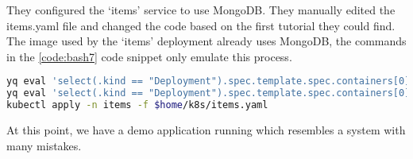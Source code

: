 They configured the `items' service to use MongoDB. They manually edited the items.yaml file and changed the code based on the first tutorial they could find. The image used by the `items' deployment already uses MongoDB, the commands in the \ref{code:bash7} code snippet only emulate this process.

\begin{lstlisting}[caption={Configure the `items' app to use MongoDB},language=bash,label=code:bash7]
yq eval 'select(.kind == "Deployment").spec.template.spec.containers[0].env[0].value = env(MONGODB_ROOT_PASSWORD)' $home/k8s/items.yaml -i
yq eval 'select(.kind == "Deployment").spec.template.spec.containers[0].env[1].value = env(MONGO_HOST)' $home/k8s/items.yaml -i
kubectl apply -n items -f $home/k8s/items.yaml
\end{lstlisting}

At this point, we have a demo application running which resembles a system with many mistakes.

